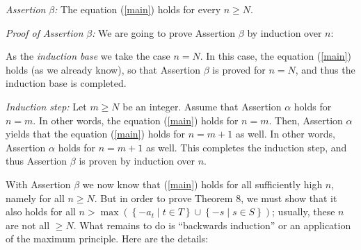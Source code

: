\documentclass[numbers=enddot,12pt,final,onecolumn,notitlepage]{scrartcl}%
\numberwithin{exer}{section}
\theoremstyle{definition}
\begin{document}
\textit{Assertion }$\beta$\textit{:} The equation (\ref{main}) holds for every
$n\geq N$.

\textit{Proof of Assertion }$\beta$\textit{:} We are going to prove Assertion
$\beta$ by induction over $n$:

As the \textit{induction base} we take the case $n=N$. In this case, the
equation (\ref{main}) holds (as we already know), so that Assertion $\beta$ is
proved for $n=N$, and thus the induction base is completed.

\textit{Induction step:} Let $m\geq N$ be an integer. Assume that Assertion
$\alpha$ holds for $n=m$. In other words, the equation (\ref{main}) holds for
$n=m$. Then, Assertion $\alpha$ yields that the equation (\ref{main}) holds
for $n=m+1$ as well. In other words, Assertion $\alpha$ holds for $n=m+1$ as
well. This completes the induction step, and thus Assertion $\beta$ is proven
by induction over $n$.

With Assertion $\beta$ we now know that (\ref{main}) holds for all
sufficiently high $n$, namely for all $n\geq N$. But in order to prove Theorem
8, we must show that it also holds for all $n>\max\left(  \left\{  -a_{t}\mid
t\in T\right\}  \cup\left\{  -s\mid s\in S\right\}  \right)  $; usually, these
$n$ are not all $\geq N$. What remains to do is ``backwards induction'' or an
application of the maximum principle. Here are the details:
\end{document}
